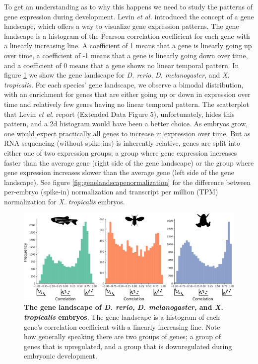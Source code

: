 To get an understanding as to why this happens we need to study the patterns of gene expression during development. Levin \textit{et al.} introduced the concept of a gene landscape, which offers a way to visualize gene expression patterns. The gene landscape is a histogram of the Pearson correlation coefficient for each gene with a linearly increasing line. A coefficient of 1 means that a gene is linearly going up over time, a coefficient of -1 means that a gene is linearly going down over time, and a coefficient of 0 means that a gene shows no linear temporal pattern. In figure \ref{fig:genelandscape} we show the gene landscape for \textit{D. rerio}, \textit{D. melanogaster}, and \textit{X. tropicalis}. For each species' gene landscape, we observe a bimodal distribution, with an enrichment for genes that are either going up or down in expression over time and relatively few genes having no linear temporal pattern. The scatterplot that Levin \textit{et al.} report (Extended Data Figure 5), unfortunately, hides this pattern, and a 2d histogram would have been a better choice. As embryos grow, one would expect practically all genes to increase in expression over time. But as RNA sequencing (without spike-ins) is inherently relative, genes are split into either one of two expression groups; a group where gene expression increases faster than the average gene (right side of the gene landscape) or the group where gene expression increases slower than the average gene (left side of the gene landscape). See figure \ref{fig:genelandscapenormalization} for the difference between per-embryo (spike-in) normalization and transcript per million (TPM) normalization for \textit{X. tropicalis} embryos.

\begin{figure}[H]
    \includegraphics[width=\linewidth]{ch.hourglass/images/gene_landscape.png}
    \caption{\textbf{The gene landscape of \textit{D. rerio}, \textit{D. melanogaster}, and \textit{X. tropicalis} embryos}. The gene landscape is a histogram of each gene's correlation coefficient with a linearly increasing line. Note how generally speaking there are two groups of genes; a group of genes that is upregulated, and a group that is downregulated during embryonic development.}
    \label{fig:genelandscape}
\end{figure}

